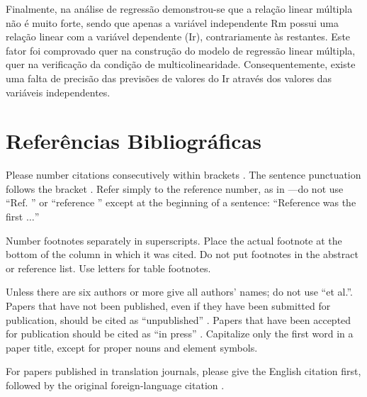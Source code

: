 \documentclass[conference]{IEEEtran}
\begin{document}
Finalmente, na análise de regressão demonstrou-se que a relação linear múltipla não é muito forte, sendo que apenas a variável independente Rm possui uma relação linear com a variável dependente (Ir), contrariamente às restantes. Este fator foi comprovado quer na construção do modelo de regressão linear múltipla, quer na verificação da condição de multicolinearidade. Consequentemente, existe uma falta de precisão das previsões de valores do Ir através dos valores das variáveis independentes.


\section*{Referências Bibliográficas}

Please number citations consecutively within brackets \cite{b1}. The 
sentence punctuation follows the bracket \cite{b2}. Refer simply to the reference 
number, as in \cite{b3}---do not use ``Ref. \cite{b3}'' or ``reference \cite{b3}'' except at 
the beginning of a sentence: ``Reference \cite{b3} was the first $\ldots$''

Number footnotes separately in superscripts. Place the actual footnote at 
the bottom of the column in which it was cited. Do not put footnotes in the 
abstract or reference list. Use letters for table footnotes.

Unless there are six authors or more give all authors' names; do not use 
``et al.''. Papers that have not been published, even if they have been 
submitted for publication, should be cited as ``unpublished'' \cite{b4}. Papers 
that have been accepted for publication should be cited as ``in press'' \cite{b5}. 
Capitalize only the first word in a paper title, except for proper nouns and 
element symbols.

For papers published in translation journals, please give the English 
citation first, followed by the original foreign-language citation \cite{b6}.


\end{document}

